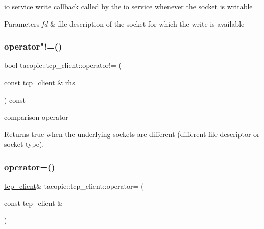 io service write callback called by the io service whenever the socket is writable


\begin{DoxyParams}{Parameters}
{\em fd} & file description of the socket for which the write is available \\
\hline
\end{DoxyParams}
\mbox{\label{classtacopie_1_1tcp__client_af352b6b1e939c919aec2761517051eb9}} 
\subsubsection{\texorpdfstring{operator"!=()}{operator!=()}}
{\footnotesize\ttfamily bool tacopie\+::tcp\+\_\+client\+::operator!= (\begin{DoxyParamCaption}\item[{const \hyperlink{classtacopie_1_1tcp__client}{tcp\+\_\+client} \&}]{rhs }\end{DoxyParamCaption}) const}

comparison operator

\begin{DoxyReturn}{Returns}
true when the underlying sockets are different (different file descriptor or socket type). 
\end{DoxyReturn}
\mbox{\label{classtacopie_1_1tcp__client_aeadcfb8cd727b2917ebcd357311d0a6b}} 
\subsubsection{\texorpdfstring{operator=()}{operator=()}}
{\footnotesize\ttfamily \hyperlink{classtacopie_1_1tcp__client}{tcp\+\_\+client}\& tacopie\+::tcp\+\_\+client\+::operator= (\begin{DoxyParamCaption}\item[{const \hyperlink{classtacopie_1_1tcp__client}{tcp\+\_\+client} \&}]{ }\end{DoxyParamCaption})\hspace{0.3cm}{\ttfamily [delete]}}



